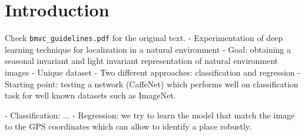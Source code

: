 \section{Introduction}
\label{sec:intro}
Check {\tt bmvc\_guidelines.pdf} for the original text.
- Experimentation of deep learning technique for localization in a natural environment
- Goal: obtaining a seasonal invariant and light invariant representation of natural environment images
- Unique dataset 
- Two different approaches: classification and regression
- Starting point: testing a network (CaffeNet) which performs well on classification task for well known datasets such as ImageNet.

- Classification: ...
- Regression: we try to learn the model that match the image to the GPS coordinates which can allow to identify a place robustly.